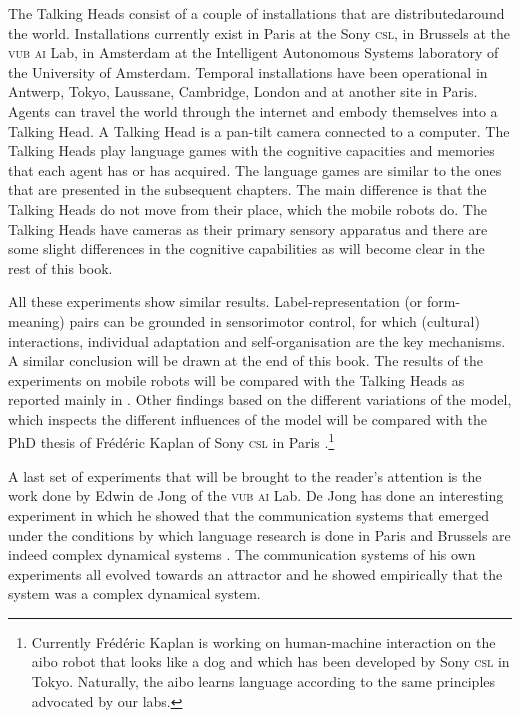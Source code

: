 The Talking Heads consist of a couple of installations that are distributed\linebreak around the world. Installations currently exist in Paris at the Sony {\scshape csl}, in Brussels at the {\scshape vub ai} Lab, in Amsterdam at the Intelligent Autonomous Systems laboratory of the University of Amsterdam. Temporal installations have been operational in Antwerp, Tokyo, Laussane, Cambridge, London and at another site in Paris. Agents can travel the world through the internet and embody themselves into a Talking Head. A Talking Head is a pan-tilt camera connected to a computer. The Talking Heads play language games with the cognitive capacities and memories that each agent has or has acquired. The language games are similar to the ones that are presented in the subsequent chapters. The main difference is that the Talking Heads do not move from their place, which the mobile robots do. The Talking Heads have cameras as their primary sensory apparatus and there are some slight differences in the cognitive capabilities as will become clear in the rest of this book.



All these experiments show similar results. Label-representation (or form-meaning) pairs can be grounded in sensorimotor control, for which (cultural) interactions, individual adaptation and self-organisation are the key mechanisms. A similar conclusion will be drawn at the end of this book. The results of the experiments on mobile robots will be compared with the Talking Heads as reported mainly in \citealt{steels:2000}. Other findings based on the different variations of the model, which inspects the different influences of the model will be compared with the PhD thesis of Fr\'ed\'eric Kaplan of Sony {\scshape csl} in Paris \citep{kaplan:2000}.\footnote{Currently Fr\'ed\'eric Kaplan is working on human-machine interaction on the {\sc aibo} robot that looks like a dog and which has been developed by Sony {\scshape csl} in Tokyo. Naturally, the {\sc aibo} learns language according to the same principles advocated by our labs.}



A last set of experiments that will be brought to the reader's attention is the work done by Edwin de Jong of the {\scshape vub ai} Lab. De Jong has done an interesting experiment in which he showed that the communication systems that emerged under the conditions by which language research is done in Paris and Brussels are indeed complex dynamical systems \citep{dejong:2000}. The communication systems of his own experiments all evolved towards an attractor and he showed empirically that the system was a complex dynamical system.

